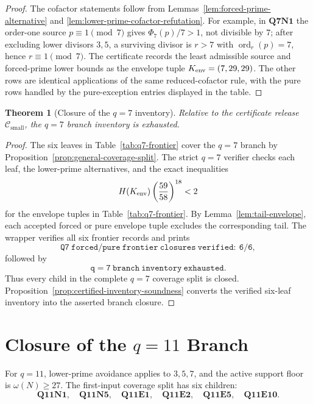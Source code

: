 \documentclass[11pt]{article}
\newtheorem{theorem}{Theorem}[section]
\theoremstyle{definition}
\theoremstyle{remark}
\DeclareMathOperator{\ord}{ord}
\newcommand{\Hfun}{H}
\newcommand{\Csmall}{\ensuremath{\mathcal C_{\mathrm{small}}}}
\begin{document}
\begin{proof}
The cofactor statements follow from Lemmas~\ref{lem:forced-prime-alternative}
and \ref{lem:lower-prime-cofactor-refutation}.  For example, in
\(\mathbf{Q7N1}\) the order-one source \(p\equiv1\pmod7\) gives
\(\Phi_7(p)/7>1\), not divisible by \(7\); after excluding lower divisors
\(3,5\), a surviving divisor is \(r>7\) with \(\ord_r(p)=7\), hence
\(r\equiv1\pmod7\).  The certificate records the least admissible source and
forced-prime lower bounds as the envelope tuple \(K_{\rm env}=(7,29,29)\).
The other rows are
identical applications of the same reduced-cofactor rule, with the pure rows
handled by the pure-exception entries displayed in the table.
\end{proof}

\begin{theorem}[Closure of the \(q=7\) inventory]
\label{thm:q7-closed}
Relative to the certificate release \(\Csmall\), the \(q=7\) branch inventory is
exhausted.
\end{theorem}

\begin{proof}
The six leaves in Table~\ref{tab:q7-frontier} cover the \(q=7\) branch by
Proposition~\ref{prop:general-coverage-split}.  The strict \(q=7\) verifier
checks each leaf, the lower-prime alternatives, and the exact inequalities
\[
  \Hfun(K_{\rm env})\left(\frac{59}{58}\right)^{18}<2
\]
for the envelope tuples in Table~\ref{tab:q7-frontier}.  By
Lemma~\ref{lem:tail-envelope}, each accepted forced or pure envelope tuple excludes
the corresponding tail.  The wrapper verifies all six frontier records and
prints
\[
  \mathtt{Q7\ forced/pure\ frontier\ closures\ verified:\ 6/6},
\]
followed by
\[
  \mathtt{q=7\ branch\ inventory\ exhausted}.
\]
Thus every child in the complete \(q=7\) coverage split is closed.
Proposition~\ref{prop:certified-inventory-soundness} converts the verified
six-leaf inventory into the asserted branch closure.
\end{proof}

\section{Closure of the \(q=11\) Branch}
\label{sec:q11}

For \(q=11\), lower-prime avoidance applies to \(3,5,7\), and the active
support floor is \(\omega(N)\ge27\).  The first-input coverage split has six
children:
\[
  \mathbf{Q11N1},\quad \mathbf{Q11N5},\quad
  \mathbf{Q11E1},\quad \mathbf{Q11E2},\quad
  \mathbf{Q11E5},\quad \mathbf{Q11E10}.
\]
\end{document}

